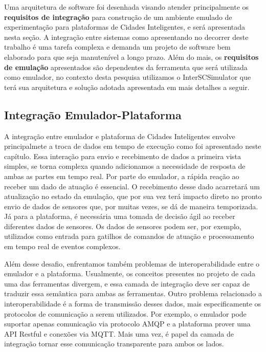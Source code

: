 Uma arquitetura de software foi desenhada visando atender principalmente os \textbf{requisitos de integração} para construção de um ambiente emulado de experimentação para plataformas
de Cidades Inteligentes, e será apresentada nesta seção.
A integração entre sistemas como apresentando no decorrer deste trabalho é uma tarefa complexa e demanda um projeto de software bem elaborado para que seja manutenível a longo prazo.
Além do mais, os \textbf{requisitos de emulação} apresentados são dependentes da ferramenta que será utilizada como emulador, no contexto desta pesquisa utilizamos o InterSCSimulator
que terá sua arquitetura e solução adotada apresentada em mais detalhes a seguir.

\subsection{Integração Emulador-Plataforma}

A integração entre emulador e plataforma de Cidades Inteligentes envolve principalmete a troca de dados em tempo de execução como foi apresentado neste capítulo.
Essa interação para envio e recebimento de dados a primeira vista simples, se torna complexa quando adicionamos a necessidade de resposta de ambas as partes em tempo real.
Por parte do emulador, a rápida reação ao receber um dado de atuação é essencial.
O recebimento desse dado acarretará um atualização no estado da emulação, que por sua vez terá impacto direto no pronto envio de dados de sensores que, por muitas vezes,
se dá de maneira temporizada.
Já para a plataforma, é necessária uma tomada de decisão ágil ao receber diferentes dados de sensores.
Os dados de sensores podem ser, por exemplo, utilizados como entrada para gatilhos de comandos de atuação e processamento em tempo real de eventos complexos.

Além desse desafio, enfrentamos também problemas de interoperabilidade entre o emulador e a plataforma.
Usualmente, os conceitos presentes no projeto de cada uma das ferramentas divergem, e essa camada de integração deve ser capaz de traduzir essa semântica para ambas as ferramentas.
Outro problema relacionado a interoperabilidade é a forma de transmissão desses dados, mais especificamente os protocolos de comunicação a serem utilizados.
Por exemplo, o emulador pode suportar apenas comunicação via protocolo AMQP e a plataforma prover uma API Restful e conexões via MQTT.
Mais uma vez, é papel da camada de integração tornar esse comunicação transparente para ambos os lados.

